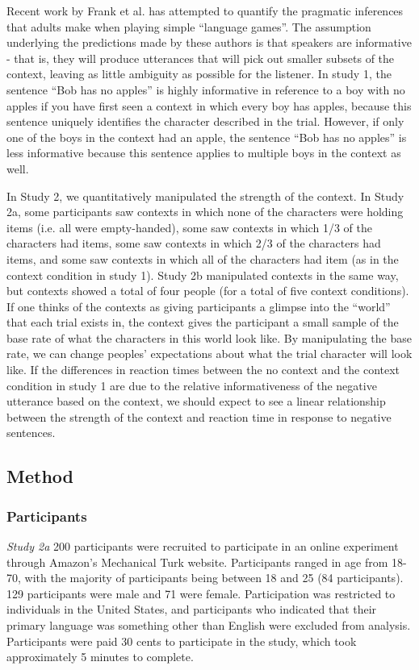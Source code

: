 \documentclass[10pt,letterpaper]{article}
\begin{document}
Recent work by Frank et al. \cite{frank2012} has attempted to quantify the pragmatic inferences that adults make when playing simple ``language games''. The assumption underlying the predictions made by these authors is that speakers are informative - that is, they will produce utterances that will pick out smaller subsets of the context, leaving as little ambiguity as possible for the listener.  In study 1, the sentence ``Bob has no apples'' is highly informative in reference to a boy with no apples if you have first seen a context in which every boy has apples, because this sentence uniquely identifies the character described in the trial.  However, if only one of the boys in the context had an apple, the sentence ``Bob has no apples'' is less informative because this sentence applies to multiple boys in the context as well.  

In Study 2, we quantitatively manipulated the strength of the context.  In Study 2a, some participants saw contexts in which none of the characters were holding items (i.e. all were empty-handed), some saw contexts in which 1/3  of the characters had items, some saw contexts in which 2/3 of the characters had items, and some saw contexts in which all of the characters had item (as in the context condition in study 1).  Study 2b manipulated contexts in the same way, but contexts showed a total of four people (for a total of five context conditions).  If one thinks of the contexts as giving participants a glimpse into the ``world'' that each trial exists in, the context gives the participant a small sample of the base rate of what the characters in this world look like.  By manipulating the base rate, we can change peoples' expectations about what the trial character will look like.  If the differences in reaction times between the no context and the context condition in study 1 are due to the relative informativeness of the negative utterance based on the context, we should expect to see a linear relationship between the strength of the context and reaction time in response to negative sentences. 

\subsection{Method}

\subsubsection{Participants } 
\emph{Study 2a} 
200 participants were recruited to participate in an online experiment through Amazon's Mechanical Turk website.  Participants ranged in age from 18-70, with the majority of participants being between 18 and 25 (84 participants).  129 participants were male and 71 were female.  Participation was restricted to individuals in the United States, and participants who indicated that their primary language was something other than English were excluded from analysis.  Participants were paid 30 cents to participate in the study, which took approximately 5 minutes to complete.  
\end{document}
